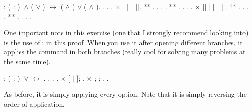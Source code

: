 \begin{coqdoccode}
\coqdocemptyline
\coqdocnoindent
{}  : \coqdockw{\ensuremath{\forall}} (   : ),  \ensuremath{\land}  ( \ensuremath{\lor} ) \ensuremath{\leftrightarrow} ( \ensuremath{\land} ) \ensuremath{\lor} ( \ensuremath{\land} ).\coqdoceol
\coqdocnoindent
{}.\coqdoceol
\coqdocindent{1.00em}
   . .\coqdoceol
\coqdocindent{1.00em}
\ensuremath{\times}  [ [ \ensuremath{|} ]].\coqdoceol
\coqdocindent{2.00em}
** . .  .  .\coqdoceol
\coqdocindent{2.00em}
** . .  .  .\coqdoceol
\coqdocindent{1.00em}
\ensuremath{\times} [[ ] \ensuremath{|} [ ]].\coqdoceol
\coqdocindent{2.00em}
** .  . .  .\coqdoceol
\coqdocindent{2.00em}
** .  . .  .\coqdoceol
\coqdocnoindent
{}.\coqdoceol
\coqdocemptyline
\end{coqdoccode}
One important note in this exercise (one that I strongly recommend looking into) is the use of ; in this proof. When you use it after opening different branches, it applies the command in both branches (really cool for solving many problems at the same time).

\begin{coqdoccode}
\coqdocemptyline
\coqdocnoindent
{}  : \coqdockw{\ensuremath{\forall}} ( : ),  \ensuremath{\lor}  \ensuremath{\leftrightarrow} .\coqdoceol
\coqdocnoindent
{}.\coqdoceol
\coqdocindent{1.00em}
 . .\coqdoceol
\coqdocindent{1.00em}
\ensuremath{\times}  [ \ensuremath{|} ];  .\coqdoceol
\coqdocindent{1.00em}
\ensuremath{\times}  ; ;  .\coqdoceol
\coqdocnoindent
{}.\coqdoceol
\coqdocemptyline
\end{coqdoccode}
As before, it is simply applying every option. Note that it is simply reversing the order of application.

